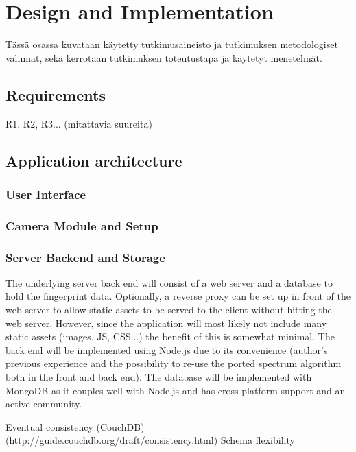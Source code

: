 \documentclass[thesis.tex]{subfiles}
\begin{document}
\chapter{Design and Implementation}
\label{chapter:design-implementation}

Tässä osassa kuvataan käytetty tutkimusaineisto ja tutkimuksen metodologiset valinnat, sekä kerrotaan tutkimuksen toteutustapa ja käytetyt menetelmät.

\section{Requirements}

R1, R2, R3... (mitattavia suureita)

\section{Application architecture}

\subsection{User Interface}

\subsection{Camera Module and Setup}

\subsection{Server Backend and Storage}

The underlying server back end will consist of a web server and a database to hold the fingerprint data. Optionally, a reverse proxy can be set up in front of the web server to allow static assets to be served to the client without hitting the web server. However, since the application will most likely not include many static assets (images, JS, CSS...) the benefit of this is somewhat minimal. The back end will be implemented using Node.js due to its convenience (author's previous experience and the possibility to re-use the ported spectrum algorithm both in the front and back end). The database will be implemented with MongoDB as it couples well with Node.js and has cross-platform support and an active community.

Eventual consistency (CouchDB) (http://guide.couchdb.org/draft/consistency.html)
Schema flexibility
\end{document}
